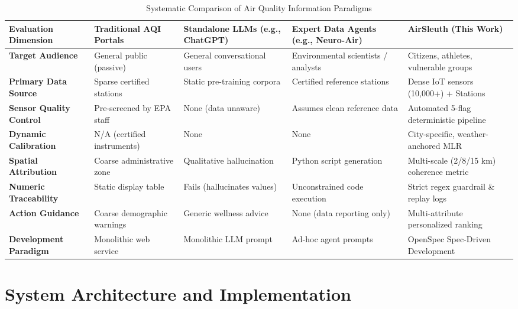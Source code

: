 \documentclass[conference]{IEEEtran}
\begin{document}
\begin{table}[t]
\caption{Systematic Comparison of Air Quality Information Paradigms}
\label{tab:comparison}
\centering
\begin{tabularx}{\textwidth}{lXXXX}
\toprule
\textbf{Evaluation Dimension} & \textbf{Traditional AQI Portals} & \textbf{Standalone LLMs (e.g., ChatGPT)} & \textbf{Expert Data Agents (e.g., Neuro-Air)} & \textbf{AirSleuth (This Work)} \\
\midrule
\textbf{Target Audience} & General public (passive) & General conversational users & Environmental scientists / analysts & Citizens, athletes, vulnerable groups \\
\textbf{Primary Data Source} & Sparse certified stations & Static pre-training corpora & Certified reference stations & Dense IoT sensors (10,000+) + Stations \\
\textbf{Sensor Quality Control} & Pre-screened by EPA staff & None (data unaware) & Assumes clean reference data & Automated 5-flag deterministic pipeline \\
\textbf{Dynamic Calibration} & N/A (certified instruments) & None & None & City-specific, weather-anchored MLR \\
\textbf{Spatial Attribution} & Coarse administrative zone & Qualitative hallucination & Python script generation & Multi-scale (2/8/15 km) coherence metric \\
\textbf{Numeric Traceability} & Static display table & Fails (hallucinates values) & Unconstrained code execution & Strict regex guardrail \& replay logs \\
\textbf{Action Guidance} & Coarse demographic warnings & Generic wellness advice & None (data reporting only) & Multi-attribute personalized ranking \\
\textbf{Development Paradigm} & Monolithic web service & Monolithic LLM prompt & Ad-hoc agent prompts & OpenSpec Spec-Driven Development \\
\bottomrule
\end{tabularx}
\end{table}

\section{System Architecture and Implementation}
\end{document}

